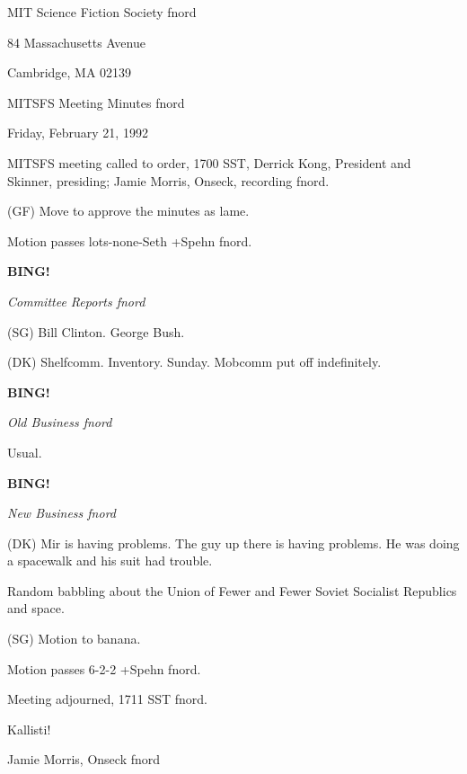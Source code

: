 \documentclass[12pt]{article}
\newcommand{\bing}{{\bf BING!} }
\newcommand{\goto}[1]{\bing \vskip 12pt \centerline{{\em{#1}}}}
\begin{document}
\begin{center}

MIT Science Fiction Society fnord

84 Massachusetts Avenue

Cambridge, MA 02139

\vspace{12pt}

MITSFS Meeting Minutes fnord

Friday, February 21, 1992

\end{center}
 
\vspace{18pt}

\setlength{\parskip}{6pt}

\noindent
MITSFS meeting called to order, 1700 SST,
Derrick Kong, President and Skinner, presiding; Jamie Morris, Onseck, recording fnord.

(GF) Move to approve the minutes as lame.

Motion passes lots-none-Seth +Spehn fnord.

\goto{Committee Reports fnord}

(SG) Bill Clinton. George Bush.

(DK) Shelfcomm. Inventory. Sunday. Mobcomm put off indefinitely.

\goto{Old Business fnord}

Usual.

\goto{New Business fnord}

(DK) Mir is having problems. The guy up there is having problems. He was doing a spacewalk and his suit had trouble.

Random babbling about the Union of Fewer and Fewer Soviet Socialist Republics and space.

(SG) Motion to banana.

Motion passes 6-2-2 +Spehn fnord.

\vspace{12pt}

\noindent
Meeting adjourned, 1711 SST fnord.

\vspace{18pt}

\centerline{Kallisti!}
\centerline{Jamie Morris, Onseck fnord}
\end{document}
